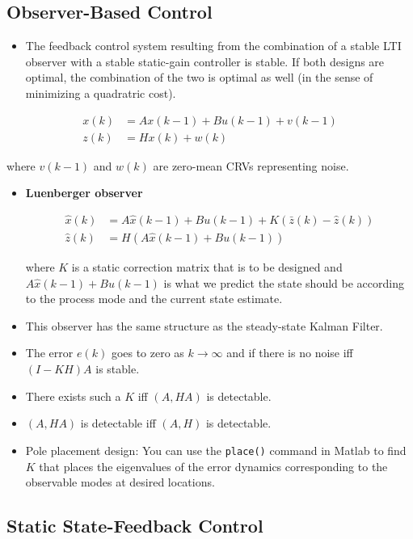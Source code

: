 \documentclass[10pt,a4paper]{scrartcl}
\begin{document}
\begin{multicols*}{2}
\section{Observer-Based Control}


\begin{itemize}
\item The feedback control system resulting from the combination of a stable LTI observer with a stable static-gain controller is stable. If both designs are optimal, the combination of the two is optimal as well (in the sense of minimizing a quadratric cost).
\end{itemize}

\begin{align*}
x(k)&=Ax(k-1)+Bu(k-1)+v(k-1)\\
z(k)&=Hx(k)+w(k)
\end{align*}

where $v(k-1)$ and $w(k)$ are zero-mean CRVs representing noise.

\begin{itemize}
\item \textbf{Luenberger observer}

\begin{align*}
\hat{x}(k)&=A\hat{x}(k-1)+Bu(k-1)+K(\bar{z}(k)-\hat{z}(k))\\
\hat{z}(k)&=H(A\hat{x}(k-1)+Bu(k-1))
\end{align*}

where $K$ is a static correction matrix that is to be designed and $A\hat{x}(k-1)+Bu(k-1)$ is what we predict the state should be according to the process mode and the current state estimate.
\item This observer has the same structure as the steady-state Kalman Filter.
\item The error $e(k)$ goes to zero as $k\rightarrow\infty$ and if there is no noise iff $(I-KH)A$ is stable.
\item There exists such a $K$ iff $(A,HA)$ is detectable.
\item $(A,HA)$ is detectable iff $(A,H)$ is detectable.
\item Pole placement design: You can use the \verb+place()+ command in Matlab to find $K$ that places the eigenvalues of the error dynamics corresponding to the observable modes at desired locations.
\end{itemize}

\subsection{Static State-Feedback Control}


\end{multicols*}
\end{document}
